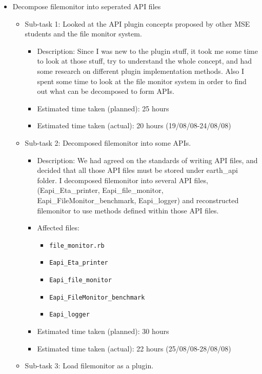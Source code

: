 \begin{itemize}
	\item Decompose filemonitor into seperated API files
	     \begin{itemize}
	        \item Sub-task 1: Looked at the API plugin concepts proposed by other MSE students and the file monitor system.
	           \begin{itemize}
					\item Description: Since I was new to the plugin stuff, it took me some time to look at those stuff, try to understand the whole concept, and had some research on different plugin implementation methods. Also I spent some time to look at the file monitor system in order to find out what can be decomposed to form APIs.
					\item Estimated time taken (planned): 25 hours
					\item Estimated time taken (actual):  20 hours (19/08/08-24/08/08)
				\end{itemize}
			\item Sub-task 2: Decomposed filemonitor into some APIs.
			   \begin{itemize}
					\item Description: We had agreed on the standards of writing API files, and decided that all those API files must be stored under earth\_api folder. I decomposed filemonitor into several API files,(Eapi\_Eta\_printer, Eapi\_file\_monitor, Eapi\_FileMonitor\_benchmark, Eapi\_logger) and reconstructed filemonitor to use methods defined within those API files.
					\item Affected files: 
					\begin{itemize}
					\item  \texttt{file\_monitor.rb}
					\item  \texttt{Eapi\_Eta\_printer}
					\item  \texttt{Eapi\_file\_monitor}
					\item  \texttt{Eapi\_FileMonitor\_benchmark}
					\item  \texttt{Eapi\_logger}
					\end{itemize}
					\item Estimated time taken (planned): 30 hours
					\item Estimated time taken (actual): 22 hours
					(25/08/08-28/08/08)
				\end{itemize}
			\item Sub-task 3: Load filemonitor as a plugin.
			        \begin{itemize}

\end{itemize}
\end{itemize}
\end{itemize}
